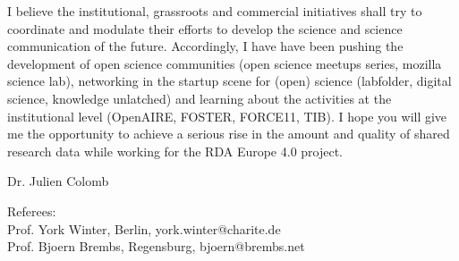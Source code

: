 I believe the institutional, grassroots and commercial initiatives shall try to coordinate and modulate their efforts to develop the science and science communication of the future. Accordingly, I have have been pushing the development of open science communities (open science meetups series, mozilla science lab), networking in the startup scene for (open) science (labfolder, digital science, knowledge unlatched) and learning about the activities at the institutional level (OpenAIRE, FOSTER, FORCE11, TIB). I hope you will give me the opportunity to achieve a serious rise in the amount and quality of shared research data while working for the RDA Europe 4.0 project.


Dr. Julien Colomb


\vspace {1.cm} 

Referees:
 \\
Prof. York Winter, Berlin, york.winter@charite.de
 \\
Prof. Bjoern Brembs, Regensburg, bjoern@brembs.net
